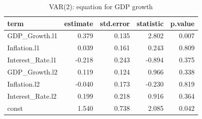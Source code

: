 \begin{table}

\caption{\label{tab:var-summary}VAR(2): equation for GDP growth}
\centering
\begin{tabular}[t]{lrrrr}
\toprule
term & estimate & std.error & statistic & p.value\\
\midrule
GDP\_Growth.l1 & 0.379 & 0.135 & 2.802 & 0.007\\
Inflation.l1 & 0.039 & 0.161 & 0.243 & 0.809\\
Interest\_Rate.l1 & -0.218 & 0.243 & -0.894 & 0.375\\
GDP\_Growth.l2 & 0.119 & 0.124 & 0.966 & 0.338\\
Inflation.l2 & -0.040 & 0.173 & -0.230 & 0.819\\
\addlinespace
Interest\_Rate.l2 & 0.199 & 0.218 & 0.916 & 0.364\\
const & 1.540 & 0.738 & 2.085 & 0.042\\
\bottomrule
\end{tabular}
\end{table}
